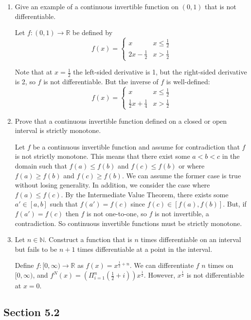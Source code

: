 \documentclass[11pt]{article}
\newcommand{\N}{\mathbb{N}}
\newcommand{\R}{\mathbb{R}}
\begin{document}
\begin{enumerate}
\item{Give an example of a continuous invertible function on $(0,1)$ that
is not differentiable.}

Let $f:(0,1)\to\R$ be defined by
\[f(x)=\begin{cases}
        x & x\leq\frac{1}{2}\\
        2x-\frac{1}{2} & x>\frac{1}{2}
\end{cases}
\]

Note that at $x=\frac{1}{2}$ the left-sided derivative is 1, but the
right-sided derivative is 2, so $f$ is not differentiable. But the inverse
of $f$ is well-defined:
\[f(x)=\begin{cases}
        x & x\leq\frac{1}{2}\\
        \frac{1}{2}x+\frac{1}{4} & x>\frac{1}{2}
\end{cases}
\]
\item{Prove that a continuous invertible function defined on a closed
or open interval is strictly monotone.}

Let $f$ be a continuous invertible function and assume for contradiction that
$f$ is not strictly monotone. This means that there exist some
$a<b<c$ in the domain such that $f(a)\leq f(b)$ and $f(c)\leq f(b)$ or where
$f(a)\geq f(b)$ and $f(c)\geq f(b)$. We can assume the former case is true
without losing generality. In addition, we consider the case where
$f(a)\leq f(c)$. By the Intermediate Value Theorem, there exists some
$a'\in[a,b]$ such that $f(a')=f(c)$ since $f(c)\in[f(a),f(b)]$.
But, if $f(a')=f(c)$ then $f$ is not one-to-one, so $f$ is not invertible,
a contradiction. So continuous invertible functions must be
strictly monotone.

\item{Let $n\in\N$. Construct a function that is $n$ times differentiable
on an interval but fails to be $n+1$ times differentiable at a point in
the interval.}

Define $f:[0,\infty)\to\R$ as $f(x)=x^{\frac{1}{2}+n}$. We can differentiate
$f$ $n$ times on $[0,\infty)$, and
$f^N(x)=\left(\Pi_{i=1}^{n}(\frac{1}{2}+i)\right)x^{\frac{1}{2}}$.
However, $x^\frac{1}{2}$ is not differentiable at $x=0$.

\end{enumerate}

\subsection*{Section 5.2}
\end{document}
